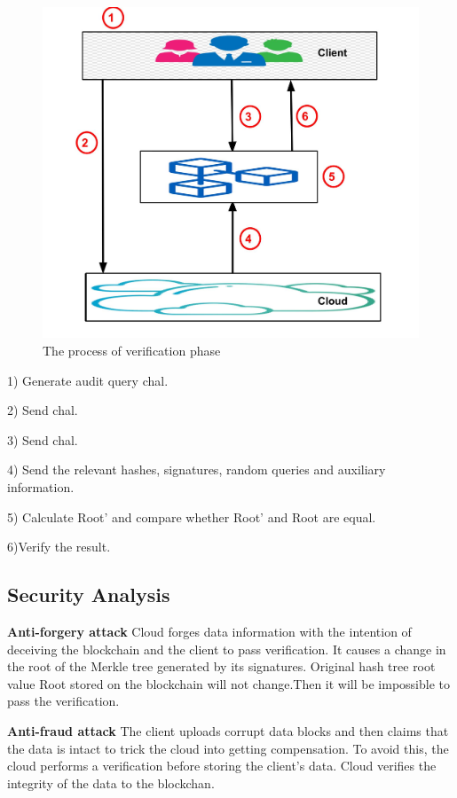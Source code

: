 \begin{figure}[H]
    \centering
    \includegraphics[scale=0.2]{figures/Copy of Untitled drawing (3).jpg}
    \caption{The process of verification phase}
 
\end{figure}

1) Generate audit query chal.

2) Send chal.

3) Send chal.

4) Send the relevant hashes, signatures, random queries and auxiliary information.

5) Calculate Root’ and compare whether Root’ and Root are equal.
 
6)Verify the result.

\subsection{Security Analysis}

\textbf{Anti-forgery attack}
Cloud forges data information with the intention of deceiving the blockchain and the client to pass verification.
It causes a change in the root of the Merkle tree generated by its signatures.
Original hash tree root value Root stored on the blockchain will not change.Then it will be impossible to pass the verification.

\textbf{Anti-fraud attack}
The client uploads corrupt data blocks and then claims that the data is intact to trick the cloud into getting compensation.
To avoid this, the cloud performs a verification before storing the client's data. Cloud verifies the integrity of the data to the blockchan.

